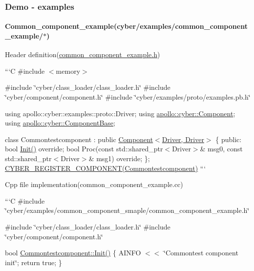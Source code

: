 {\ttfamily \subsubsection*{Demo -\/ examples}}

{\ttfamily }

{\ttfamily \paragraph*{Common\-\_\-component\-\_\-example(cyber/examples/common\-\_\-component\-\_\-example/$\ast$)}}

{\ttfamily  Header definition(\hyperlink{common__component__example_8h}{common\-\_\-component\-\_\-example.\-h})}

{\ttfamily ```\-C \#include $<$memory$>$}

{\ttfamily \#include \char`\"{}cyber/class\-\_\-loader/class\-\_\-loader.\-h\char`\"{} \#include \char`\"{}cyber/component/component.\-h\char`\"{} \#include \char`\"{}cyber/examples/proto/examples.\-pb.\-h\char`\"{}}

{\ttfamily using apollo\-::cyber\-::examples\-::proto\-::\-Driver; using \hyperlink{classapollo_1_1cyber_1_1Component}{apollo\-::cyber\-::\-Component}; using \hyperlink{classapollo_1_1cyber_1_1ComponentBase}{apollo\-::cyber\-::\-Component\-Base};}

{\ttfamily class Commontestcomponent \-: public \hyperlink{classapollo_1_1cyber_1_1Component}{Component$<$\-Driver, Driver$>$} \{ public\-: bool \hyperlink{namespaceapollo_1_1cyber_a2d055a81b338116634deaf8ac3367aca}{Init()} override; bool Proc(const std\-::shared\-\_\-ptr$<$\-Driver$>$\& msg0, const std\-::shared\-\_\-ptr$<$\-Driver$>$\& msg1) override; \}; \hyperlink{component_8h_a031103527dc7f59a627459d635de10f8}{C\-Y\-B\-E\-R\-\_\-\-R\-E\-G\-I\-S\-T\-E\-R\-\_\-\-C\-O\-M\-P\-O\-N\-E\-N\-T(\-Commontestcomponent)} ```}

{\ttfamily Cpp file implementation(common\-\_\-component\-\_\-example.\-cc)}

{\ttfamily ```\-C \#include \char`\"{}cyber/examples/common\-\_\-component\-\_\-smaple/common\-\_\-component\-\_\-example.\-h\char`\"{}}

{\ttfamily \#include \char`\"{}cyber/class\-\_\-loader/class\-\_\-loader.\-h\char`\"{} \#include \char`\"{}cyber/component/component.\-h\char`\"{}}

{\ttfamily bool \hyperlink{namespaceapollo_1_1cyber_a2d055a81b338116634deaf8ac3367aca}{Commontestcomponent\-::\-Init()} \{ A\-I\-N\-F\-O $<$$<$ \char`\"{}\-Commontest component init\char`\"{}; return true; \}}

